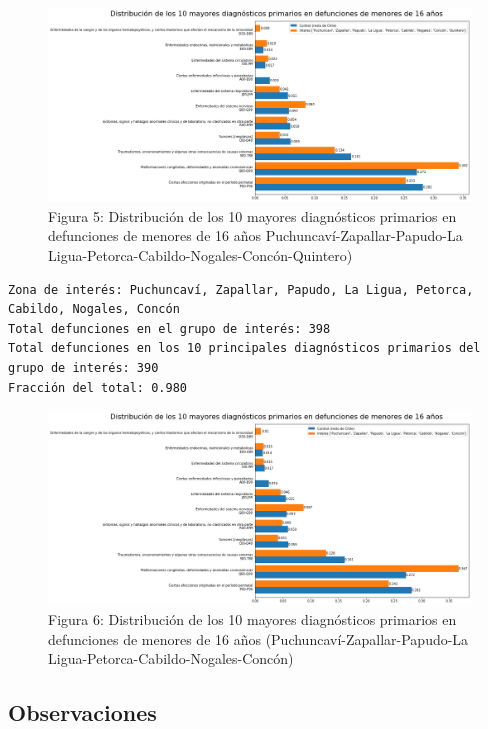 \documentclass[]{article}
\begin{document}
\begin{figure}
\centering
\includegraphics{assets/10-diagnosticos-(Puchuncavi-Zapallar-Papudo-LaLigua-Petorca-Cabildo-Nogales-Concon-Quintero).png}
\caption{Figura 5: Distribución de los 10 mayores diagnósticos primarios en defunciones de menores de 16 años Puchuncaví-Zapallar-Papudo-La Ligua-Petorca-Cabildo-Nogales-Concón-Quintero)}
\end{figure}

\begin{verbatim}
Zona de interés: Puchuncaví, Zapallar, Papudo, La Ligua, Petorca, Cabildo, Nogales, Concón
Total defunciones en el grupo de interés: 398
Total defunciones en los 10 principales diagnósticos primarios del grupo de interés: 390
Fracción del total: 0.980
\end{verbatim}

\begin{figure}
\centering
\includegraphics{assets/10-diagnosticos-(Puchuncavi-Zapallar-Papudo-LaLigua-Petorca-Cabildo-Nogales-Concon).png}
\caption{Figura 6: Distribución de los 10 mayores diagnósticos primarios en defunciones de menores de 16 años (Puchuncaví-Zapallar-Papudo-La Ligua-Petorca-Cabildo-Nogales-Concón)}
\end{figure}

\hypertarget{observaciones}{%
\subsection{Observaciones}\label{observaciones}}
\end{document}
